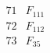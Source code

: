 \documentclass{article}
\begin{document}
{$$\begin{array}{|r|*{7}{r|}}
 & 
 & 
\\
\hline
71 
 & F_{111} &
 & 
 & 
 & 
 & 
 & 
\\
\hline
72 
 & F_{112} &
 & 
 & 
 & 
 & 
 & 
\\
\hline
73 
 & F_{35} &
 & 

\end{array}$$}
\end{document}
